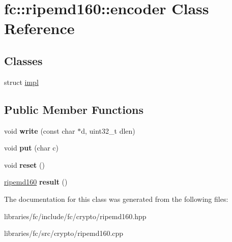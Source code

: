 \hypertarget{classfc_1_1ripemd160_1_1encoder}{}\section{fc\+:\+:ripemd160\+:\+:encoder Class Reference}
\label{classfc_1_1ripemd160_1_1encoder}
\subsection*{Classes}
\begin{DoxyCompactItemize}
\item 
struct \mbox{\hyperlink{structfc_1_1ripemd160_1_1encoder_1_1impl}{impl}}
\end{DoxyCompactItemize}
\subsection*{Public Member Functions}
\begin{DoxyCompactItemize}
\item 
\mbox{\label{classfc_1_1ripemd160_1_1encoder_afee34a8345635e33de7815e88d44b8ea}} 
void {\bfseries write} (const char $\ast$d, uint32\+\_\+t dlen)
\item 
\mbox{\label{classfc_1_1ripemd160_1_1encoder_ab1497be30dbb12cf7f9b0d09b7222fdd}} 
void {\bfseries put} (char c)
\item 
\mbox{\label{classfc_1_1ripemd160_1_1encoder_abf2955a65ccd6a6bd943e5fe97c2ca2e}} 
void {\bfseries reset} ()
\item 
\mbox{\label{classfc_1_1ripemd160_1_1encoder_ae9d341abf0f58f68a58a2a00c15af411}} 
\mbox{\hyperlink{classfc_1_1ripemd160}{ripemd160}} {\bfseries result} ()
\end{DoxyCompactItemize}


The documentation for this class was generated from the following files\+:\begin{DoxyCompactItemize}
\item 
libraries/fc/include/fc/crypto/ripemd160.\+hpp\item 
libraries/fc/src/crypto/ripemd160.\+cpp\end{DoxyCompactItemize}
